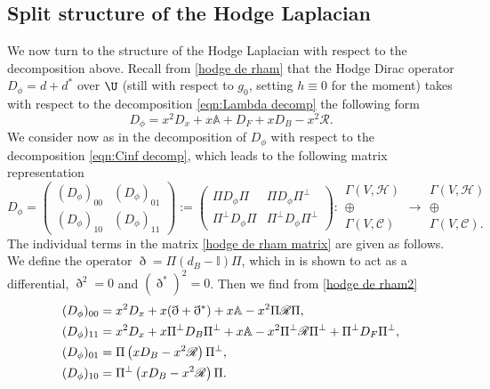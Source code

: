 \documentclass[JEP,XML,SOM,Unicode,NoFloatCountersInSection,published]{cedram}
\theoremstyle{plain}
\theoremstyle{definition}
\begin{document}
\subsection{Split structure of the Hodge Laplacian} \label{subsec:split hodge}
We now turn to the structure of the Hodge Laplacian with respect to the decomposition above.
Recall from \eqref{hodge de rham} that the Hodge Dirac operator $D_\phi = d + d^{*}$ over $\U$
(still with respect to $g_0$, setting $h\equiv 0$ for the moment)
takes with respect to the decomposition \eqref{eqn:Lambda decomp} the following form
\begin{equation}\label{hodge de rham2}
D_\phi = x^{2}D_{x} + x \mathbb{A} + D_{F} + xD_{B}
-x^{2}\mathscr{R}.
\end{equation}
We consider now as in \cite{gravi-ins}
the decomposition of $D_\phi$ with respect to the
decomposition \eqref{eqn:Cinf decomp}, which leads to the following
matrix representation
\begin{equation}\label{hodge de rham matrix}
D_\phi =
\begin{pmatrix}
(D_\phi)_{00} & (D_\phi)_{01}\\
(D_\phi)_{10} & (D_\phi)_{11}
\end{pmatrix} :=
\begin{pmatrix}
\Pi D_\phi \Pi & \Pi D_\phi \Pi^{\bot}\\
\Pi^{\bot} D_\phi \Pi & \Pi^{\bot} D_\phi \Pi^{\bot}
\end{pmatrix}
:
\begin{matrix}
\Gamma(V,\mathscr{H}) \\ \oplus \\ \Gamma(V,\mathscr{C})
\end{matrix}
\to
\begin{matrix}
\Gamma(V,\mathscr{H}) \\ \oplus \\ \Gamma(V,\mathscr{C}).
\end{matrix}
\end{equation}
The individual terms in the matrix \eqref{hodge de rham matrix} are given as follows.
We define the operator $\eth = \Pi(d_{B} - \mathbb{I})\Pi$,
which in \cite[Prop.\,15]{gravi-ins} is shown to act as a differential, \ie $\eth^{2} =0$ and $(\eth^{*})^{2} = 0$.
Then we find from \eqref{hodge de rham2}
\begin{align}
&(D_\phi)_{00} =
x^2 D_{x} + x(\eth + \eth^{*}) + x \mathbb{A} - x^{2} \Pi \mathscr{R}\Pi,\\
& (D_\phi)_{11} =
x^{2}D_{x} + x \Pi^{\bot}D_{B}\Pi^{\bot} + x \mathbb{A} - x^{2}\Pi^{\bot} \mathscr{R} \Pi^{\bot} + \Pi^{\bot} D_F \Pi^{\bot},\\\label{D_{01}}
&(D_\phi)_{01} =
\Pi\left(xD_{B} - x^{2} \mathscr{R}\right) \Pi^{\bot},\\ \label{D_{10}}
&(D_\phi)_{10} =
\Pi^{\bot}\left(xD_{B} - x^{2} \mathscr{R}\right) \Pi.
\end{align}
\end{document}
